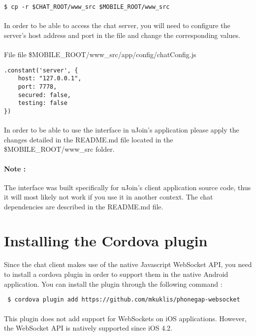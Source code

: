 \begin{verbatim}
$ cp -r $CHAT_ROOT/www_src $MOBILE_ROOT/www_src
\end{verbatim}

\paragraph{} In order to be able to access the chat server, you will need to 
configure the server's host address and port in the file and change the 
corresponding values.

\paragraph{} File file \$MOBILE\_ROOT/www\_src/app/config/chatConfig.js
\begin{verbatim}
.constant('server', {
    host: "127.0.0.1",
    port: 7778, 
    secured: false,
    testing: false
})
\end{verbatim}

\paragraph{} In order to be able to use the interface in uJoin's 
application please apply the changes detailed in the README.md file located in 
the \$MOBILE\_ROOT/www\_src folder.

\paragraph{Note :} The interface was built specifically for uJoin's client 
application source code, thus it will most likely not work if you use it in 
another context. The chat dependencies are described in the README.md file.

\section{Installing the Cordova plugin}

\paragraph{} Since the chat client makes use of the native Javascript WebSocket 
API, you need to install a cordova plugin in order to support them in the 
native Android application. You can install the plugin through the following 
command :

\begin{verbatim}
 $ cordova plugin add https://github.com/mkuklis/phonegap-websocket
\end{verbatim}

\paragraph{} This plugin does not add support for WebSockets on iOS 
applications. However, the WebSocket API is natively supported since iOS 4.2.
